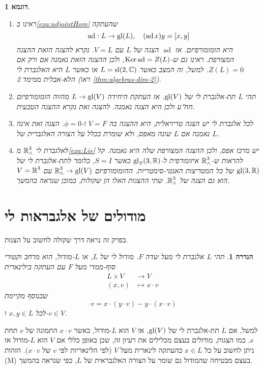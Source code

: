 \documentclass{report}
\theoremstyle{break}
\newtheorem{definition}[definition]{הגדרה}
\newtheorem{example}[example]{דוגמא}
\theoremstyle{MyNonumberbreak}
\DeclareMathOperator{\ad}{ad} %
\begin{document}
\begin{example} \label{exa:representations}
	\begin{enumerate}[label=(\alph*)]
		\item 
		ראינו ב\autoref*{exa:adjointHom} שהעתקה
		\[ \ad : L \to \gl(L), \quad (\ad x)y = [x, y] \]
		היא הומומורפיזם. אז $\ad$ הצגה של $L$ עם $V = L$. נקרא להצגה הזאת \textit{ההצגה המצורפת}. ראינו גם ש-$\Ker\ad = Z(L)$, ולכן ההצגה הזאת נאמנה אם ורק אם $Z(L) = 0$. למשל, זה המצב כאשר $L = \operatorname{sl}(2, \operatorname{\mathbb{C}})$ או כאשר $L$ היא האלגברת לי הלא-אבלית ממימד 2 (ראו \autoref*{thm:algebras-dim-2}).
		\item
		תהי $L$ תת-אלגברת לי של $\operatorname{gl}(V)$. אז העתקת היחידה $L \to \operatorname{gl}(V)$ מהווה הומומורפיזם חח"ע ולכן היא הצגה נאמנה. להצגה זאת נקרא \textit{ההצגה הטבעית}.
		\item
		לכל אלגברת לי יש \textit{הצגה טריויאלית}, היא ההצגה בה $V = F$ ו-$\phi = 0$. הצגה זאת אינה נאמנה אם $L$ שונה מאפס, ולא שומרת בכלל על הצורה האלגברית של $L$.
		\item
		לאלגברת לי $\operatorname{\mathbb{R}}_\wedge^3$ מ\autoref*{exa:Lie} יש מרכז אפס, ולכן ההצגה המצורפת שלה היא נאמנה. קל להראות ש-$\operatorname{\mathbb{R}}_\wedge^3$ איזומורפית ל-$\operatorname{gl}_S(3, \operatorname{\mathbb{R}})$ כאשר $S = I$, כלומר לתת-אלגברת לי של $\operatorname{gl}(3, \operatorname{\mathbb{R}})$ של כל המטריצות האנטי-סימטריות. ההומומורפיזם $\operatorname{\mathbb{R}}_\wedge^3 \to \operatorname{gl}(V)$ עם $V = \operatorname{\mathbb{R}}^3$ הוא גם הצגה של $\operatorname{\mathbb{R}}_\wedge^3$. שתי ההצגות האלו הן שקולות, במובן שנראה בהמשך.
	\end{enumerate}
\end{example}

\section{מודולים של אלגבראות לי}
בפרק זה נראה דרך שקולה לחשוב על הצגות.
\begin{definition}
	תהי $L$ אלגברת לי מעל שדה $F$. \textit{מודול לי} של $L$, או \textit{$L$-מודול}, הוא מרחב וקטורי סוף-ממדי מעל $F$ עם העתקה בילינארית
	\begin{align*}
		L \times V &\longrightarrow V \\
		(x, v) &\longmapsto x \cdot v
	\end{align*}
	שבנוסף מקיימת
	\begin{equation*}
		[x, y] \cdot v = x \cdot (y \cdot v) - y \cdot (x \cdot v) \tag{M}
	\end{equation*}
	לכל $x, y \in L$ ו-$v \in V$.
\end{definition}
למשל, אם $L$ תת-אלגברת לי של $\operatorname{gl}(V)$, אז $V$ הוא $L$-מודול, כאשר $x \cdot v$ התמונה של $v$ תחת $x$. כמו הצגות, מודולים בעצם מכלילים את רעיון זה, שכן באופן כללי אם $V$ הוא $L$-מודול אז ניתן לחשוב על כל $x \in L$ כהעתקה לינארית מעל $V$ (לפי הלינאריות לפי $v$ של $x \cdot v$). הזהות (M) בעצם מבטיחה שהמודול גם שומר על הצורה האלגבראית של $L$, כפי שנראה בהמשך.
\end{document}
